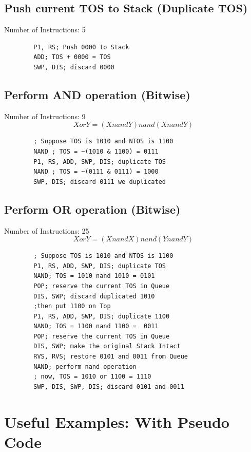 \documentclass[11pt]{report}
\begin{document}
    \subsection{Push current TOS to Stack (Duplicate TOS)}
    Number of Instructions: 5
    \begin{verbatim}
        P1, RS; Push 0000 to Stack
        ADD; TOS + 0000 = TOS
        SWP, DIS; discard 0000
    \end{verbatim}

    \subsection{Perform AND operation (Bitwise)}
    Number of Instructions: 9
    $$X or Y = (XnandY)nand(XnandY)$$
    \begin{verbatim}
        ; Suppose TOS is 1010 and NTOS is 1100
        NAND ; TOS = ~(1010 & 1100) = 0111
        P1, RS, ADD, SWP, DIS; duplicate TOS 
        NAND ; TOS = ~(0111 & 0111) = 1000
        SWP, DIS; discard 0111 we duplicated
    \end{verbatim}

    \subsection{Perform OR operation (Bitwise)}
    Number of Instructions: 25
    $$XorY = (XnandX)nand(YnandY)$$
    \begin{verbatim}
        ; Suppose TOS is 1010 and NTOS is 1100
        P1, RS, ADD, SWP, DIS; duplicate TOS 
        NAND; TOS = 1010 nand 1010 = 0101
        POP; reserve the current TOS in Queue
        DIS, SWP; discard duplicated 1010
        ;then put 1100 on Top
        P1, RS, ADD, SWP, DIS; duplicate 1100
        NAND; TOS = 1100 nand 1100 =  0011
        POP; reserve the current TOS in Queue
        DIS, SWP; make the original Stack Intact
        RVS, RVS; restore 0101 and 0011 from Queue
        NAND; perform nand operation
        ; now, TOS = 1010 or 1100 = 1110
        SWP, DIS, SWP, DIS; discard 0101 and 0011
    \end{verbatim}

    \section{Useful Examples: With Pseudo Code}
\end{document}
